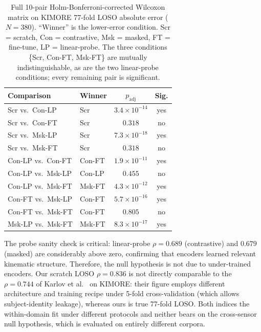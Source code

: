 \documentclass[10pt,journal]{IEEEtran}
\begin{document}
\begin{table}[t]
\centering
\footnotesize
\setlength{\tabcolsep}{4pt}
\caption{Full 10-pair Holm-Bonferroni-corrected Wilcoxon matrix on KIMORE 77-fold LOSO absolute error ($N=380$). ``Winner'' is the lower-error condition. Scr = scratch, Con = contrastive, Msk = masked, FT = fine-tune, LP = linear-probe. The three conditions \{Scr, Con-FT, Msk-FT\} are mutually indistinguishable, as are the two linear-probe conditions; every remaining pair is significant.}
\label{tab:pairwise-full}
\begin{tabular}{llcc}
\toprule
Comparison & Winner & $p_{\text{adj}}$ & Sig. \\
\midrule
Scr vs.\ Con-LP    & Scr    & $3.4\times10^{-14}$ & yes \\
Scr vs.\ Con-FT    & Scr    & $0.318$             & no  \\
Scr vs.\ Msk-LP    & Scr    & $7.3\times10^{-18}$ & yes \\
Scr vs.\ Msk-FT    & Scr    & $0.318$             & no  \\
Con-LP vs.\ Con-FT & Con-FT & $1.9\times10^{-11}$ & yes \\
Con-LP vs.\ Msk-LP & Con-LP & $0.455$             & no  \\
Con-LP vs.\ Msk-FT & Msk-FT & $4.3\times10^{-12}$ & yes \\
Con-FT vs.\ Msk-LP & Con-FT & $5.7\times10^{-16}$ & yes \\
Con-FT vs.\ Msk-FT & Con-FT & $0.805$             & no  \\
Msk-LP vs.\ Msk-FT & Msk-FT & $8.3\times10^{-17}$ & yes \\
\bottomrule
\end{tabular}
\end{table}

The probe sanity check is critical: linear-probe $\rho = 0.689$ (contrastive) and $0.679$ (masked) are considerably above zero, confirming that encoders learned relevant kinematic structure. Therefore, the null hypothesis is not due to under-trained encoders. Our scratch LOSO $\rho = 0.836$ is not directly comparable to the $\rho = 0.744$ of Karlov et al.\ \cite{karlov2024} on KIMORE: their figure employs different architecture and training recipe under 5-fold cross-validation (which allows subject-identity leakage), whereas ours is true 77-fold LOSO. Both indices the within-domain fit under different protocols and neither bears on the cross-sensor null hypothesis, which is evaluated on entirely different corpora.
\end{document}
